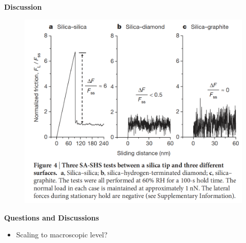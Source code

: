 \documentclass[11pt]{beamer}
\begin{document}
\begin{frame}{\textbf{Discussion}}
    \begin{figure}
        \includegraphics[width=0.6\linewidth]{images/4}
    \end{figure}
\end{frame}

\begin{frame}{\textbf{Questions and Discussions}}
    \begin{itemize}
        \item Scaling to macroscopic level?
    \end{itemize}
\end{frame}
\end{document}
